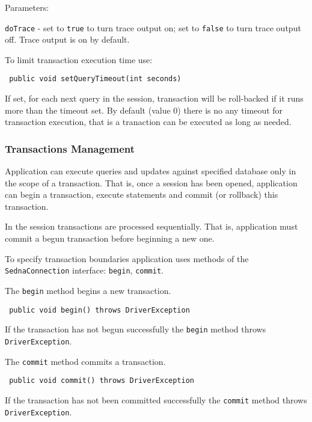 \documentclass[a4paper,12pt]{article}
\begin{document}
Parameters:

\verb!doTrace! - set to \verb!true! to turn trace output on; set to \verb!false!
to turn trace output off. Trace output is on by default.

To limit transaction execution time use:

\begin{verbatim}
 public void setQueryTimeout(int seconds)
\end{verbatim}

If set, for each next query in the session, transaction will be roll-backed if
it runs more than the timeout set. By default (value 0) there is no any timeout
for transaction execution, that is a tranaction can be executed as long as
needed.

\subsubsection{Transactions Management}
Application can execute queries and updates against specified database only in
the scope of a transaction. That is, once a session has been opened, application
can begin a transaction, execute statements and commit (or rollback) this
transaction.

In the session transactions are processed sequentially. That is, application
must commit a begun transaction before beginning a new one.

To specify transaction boundaries application uses methods of the
\verb!SednaConnection! interface: \verb!begin!, \verb!commit!.

The \verb!begin! method begins a new transaction.

\begin{verbatim}
 public void begin() throws DriverException
\end{verbatim}

If the transaction has not begun successfully the \verb!begin! method throws
\verb!DriverException!.

The \verb!commit! method commits a transaction.

\begin{verbatim}
 public void commit() throws DriverException
\end{verbatim}

If the transaction has not been committed successfully the \verb!commit! method
throws \verb!DriverException!.
\end{document}
